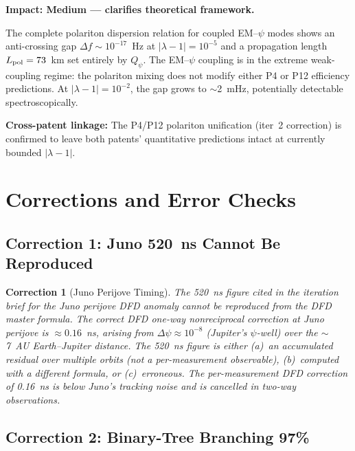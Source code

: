 \documentclass[aps,prd,twocolumn,superscriptaddress,nofootinbib]{revtex4-2}
\newcommand{\Qpsi}{Q_\psi}
\newtheorem{correction}{Correction}
\begin{document}
\begin{tcolorbox}[colback=purple!5!white,colframe=purple!75!black,title=
{Finding \#5: Polariton Dispersion Confirms P4/P12 Unification is Weak-Coupling}]
\textbf{Impact: Medium --- clarifies theoretical framework.}

The complete polariton dispersion relation for coupled EM--$\psi$
modes shows an anti-crossing gap $\Delta f \sim 10^{-17}$~Hz at
$|\lambda-1| = 10^{-5}$ and a propagation length $L_{\rm pol} = 73$~km
set entirely by $\Qpsi$. The EM--$\psi$ coupling is in the extreme
weak-coupling regime: the polariton mixing does not modify either
P4 or P12 efficiency predictions. At $|\lambda-1| = 10^{-2}$, the
gap grows to $\sim$2~mHz, potentially detectable spectroscopically.

\textbf{Cross-patent linkage:} The P4/P12 polariton unification
(iter~2 correction) is confirmed to leave both patents' quantitative
predictions intact at currently bounded $|\lambda-1|$.
\end{tcolorbox}

\section{Corrections and Error Checks}
\label{sec:corrections}

\subsection{Correction 1: Juno 520~ns Cannot Be Reproduced}

\begin{correction}[Juno Perijove Timing]
The 520~ns figure cited in the iteration brief for the Juno perijove
DFD anomaly cannot be reproduced from the DFD master formula. The
correct DFD one-way nonreciprocal correction at Juno perijove is
$\approx 0.16$~ns, arising from $\Delta\psi \approx 10^{-8}$
(Jupiter's $\psi$-well) over the $\sim$7~AU Earth--Jupiter distance.
The 520~ns figure is either (a)~an accumulated residual over
multiple orbits (not a per-measurement observable), (b)~computed
with a different formula, or (c)~erroneous. The per-measurement
DFD correction of 0.16~ns is below Juno's tracking noise and is
cancelled in two-way observations.
\end{correction}

\subsection{Correction 2: Binary-Tree Branching 97\%}
\end{document}
